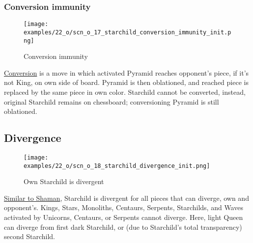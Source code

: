 \subsubsection*{Conversion immunity}
\label{sec:One/Starchild/Movement/Conversion immunity}

\vspace*{-1.4\baselineskip}
\noindent
\begin{figure}[!h]
\texttt{[image: examples/22\_o/scn\_o\_17\_starchild\_conversion\_immunity\_init.png]}
\caption{Conversion immunity}
\label{fig:scn_o_17_starchild_conversion_immunity_init}
\end{figure}

\hyperref[sec:Mayan Ascendancy/Pyramid/Conversion]{Conversion} is a move in which
activated Pyramid reaches opponent's piece, if it's not King, on own side of board.
Pyramid is then oblationed, and reached piece is replaced by the same piece in own
color. Starchild cannot be converted, instead, original Starchild remains on
chessboard; conversioning Pyramid is still oblationed.

\clearpage %

\subsection*{Divergence}
\label{sec:One/Starchild/Divergence}

\vspace*{-1.5\baselineskip}
\noindent
\begin{figure}[!h]
\texttt{[image: examples/22\_o/scn\_o\_18\_starchild\_divergence\_init.png]}
\vspace*{-1.4\baselineskip}
\caption{Own Starchild is divergent}
\label{fig:scn_o_18_starchild_divergence_init}
\end{figure}

\vspace*{-0.5\baselineskip}
\hyperref[fig:scn_cot_11_own_shaman_is_divergent_init]{Similar to Shaman},
Starchild is divergent for all pieces that can diverge, own and opponent's.
Kings, Stars, Monoliths, Centaurs, Serpents, Starchilds, and Waves activated
by Unicorns, Centaurs, or Serpents cannot diverge. Here, light Queen can
diverge from first dark Starchild, or (due to Starchild's total transparency)
second Starchild.


